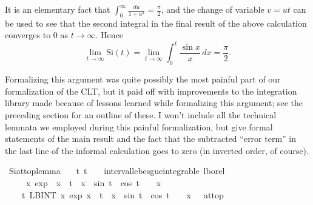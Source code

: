 \documentclass[leqno]{article}
\theoremstyle{definition}
\newcommand\Si{\text{Si}}
\begin{document}
It is an elementary fact that $\int_0^\infty \frac{du}{1+u^2} = \frac{\pi}{2}$, and the change of variable $v = ut$ can be used to see that the second integral in the final result of the above calculation converges to $0$ as $t \rightarrow \infty$. Hence
\[ \lim_{t \rightarrow \infty} \Si(t) = \lim_{t \rightarrow \infty} \int_0^t \frac{\sin x}{x} \, dx = \frac{\pi}{2}. \]

Formalizing this argument was quite possibly the most painful part of our formalization of the CLT, but it paid off with improvements to the integration library made because of lessons learned while formalizing this argument; see the preceding section for an outline of these. I won't include all the technical lemmata we employed during this painful formalization, but give formal statements of the main result and the fact that the subtracted ``error term'' in the last line of the informal calculation goes to zero (in inverted order, of course).\phantom{)}

\medskip

\begin{isabellebody}
\isamarkupfalse%
\ Si{\isacharunderscore}at{\isacharunderscore}top{\isacharunderscore}lemma{\isacharcolon}\isanewline
\ \ \ {\isachardoublequoteopen}{\isasymAnd}t{\isachardot}\ t\ {\isasymge}\ {}\ {\isasymLongrightarrow}\ interval{\isacharunderscore}lebesgue{\isacharunderscore}integrable\ lborel\ {}\ {\isasyminfinity}\isanewline
\ \ \ \ \ {\isacharparenleft}{\isasymlambda}x{\isachardot}\ exp\ {\isacharparenleft}{\isacharminus}\ {\isacharparenleft}x\ {\isacharasterisk}\ t{\isacharparenright}{\isacharparenright}\ {\isacharasterisk}\ {\isacharparenleft}x\ {\isacharasterisk}\ sin\ t\ {\isacharplus}\ cos\ t{\isacharparenright}\ {\isacharslash}\ {\isacharparenleft}{}\ {\isacharplus}\ x\isanewline
\ \ \isanewline
\ \ \ \ {\isachardoublequoteopen}{\isacharparenleft}{\isacharparenleft}{\isasymlambda}t{\isachardot}\ {\isacharparenleft}LBINT\ x{\isacharequal}{}{\isachardot}{\isachardot}{\isasyminfinity}{\isachardot}\ exp\ {\isacharparenleft}{\isacharminus}{\isacharparenleft}x\ {\isacharasterisk}\ t{\isacharparenright}{\isacharparenright}\ {\isacharasterisk}\ {\isacharparenleft}x\ {\isacharasterisk}\ sin\ t\ {\isacharplus}\ cos\ t{\isacharparenright}\ {\isacharslash}\ {\isacharparenleft}{}\ {\isacharplus}\ x{\isacharcircum}{}{\isacharparenright}{\isacharparenright}{\isacharparenright}\ {\isacharminus}{\isacharminus}{\isacharminus}{\isachargreater}\ {}{\isacharparenright}\ at{\isacharunderscore}top{\isachardoublequoteclose}
\end{isabellebody}
\end{document}
